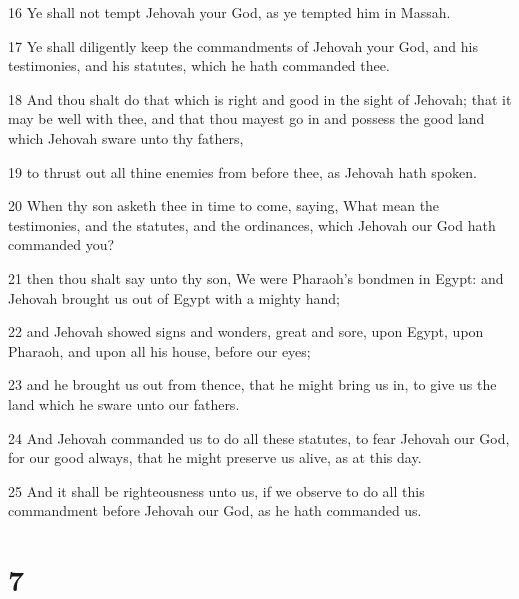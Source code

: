 \par 16 Ye shall not tempt Jehovah your God, as ye tempted him in Massah.
\par 17 Ye shall diligently keep the commandments of Jehovah your God, and his testimonies, and his statutes, which he hath commanded thee.
\par 18 And thou shalt do that which is right and good in the sight of Jehovah; that it may be well with thee, and that thou mayest go in and possess the good land which Jehovah sware unto thy fathers,
\par 19 to thrust out all thine enemies from before thee, as Jehovah hath spoken.
\par 20 When thy son asketh thee in time to come, saying, What mean the testimonies, and the statutes, and the ordinances, which Jehovah our God hath commanded you?
\par 21 then thou shalt say unto thy son, We were Pharaoh's bondmen in Egypt: and Jehovah brought us out of Egypt with a mighty hand;
\par 22 and Jehovah showed signs and wonders, great and sore, upon Egypt, upon Pharaoh, and upon all his house, before our eyes;
\par 23 and he brought us out from thence, that he might bring us in, to give us the land which he sware unto our fathers.
\par 24 And Jehovah commanded us to do all these statutes, to fear Jehovah our God, for our good always, that he might preserve us alive, as at this day.
\par 25 And it shall be righteousness unto us, if we observe to do all this commandment before Jehovah our God, as he hath commanded us.

\chapter{7}

